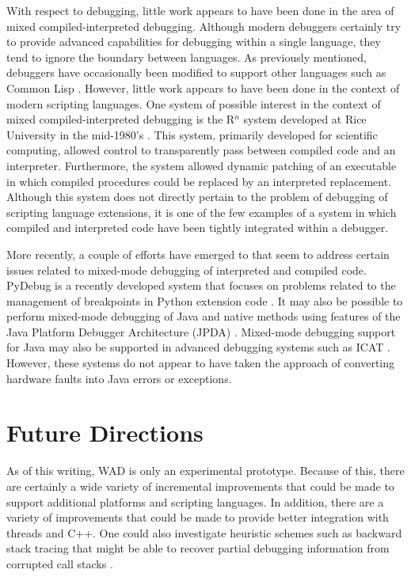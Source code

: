 With respect to debugging, little work appears to have been done in the area of
mixed compiled-interpreted debugging.   Although modern debuggers
certainly try to provide advanced capabilities for debugging within a
single language, they tend to ignore the boundary between languages.
As previously mentioned, debuggers have occasionally been modified to
support other languages such as Common Lisp \cite{wcl}.  However, little work appears
to have been done in the context of modern scripting languages.  One system of possible interest
in the context of mixed compiled-interpreted debugging is the R$^{n}$
system developed at Rice University in the mid-1980's \cite{carle}.  This
system, primarily developed for scientific computing, allowed control
to transparently pass between compiled code and an interpreter.
Furthermore, the system allowed dynamic patching of an executable in
which compiled procedures could be replaced by an interpreted
replacement.  Although this system does not directly pertain to the problem of 
debugging of scripting language extensions, it is one of the few
examples of a system in which compiled and interpreted code have been
tightly integrated within a debugger.

More recently, a couple of efforts have emerged to that seem to
address certain issues related to mixed-mode debugging of interpreted
and compiled code. PyDebug is a recently developed system that focuses
on problems related to the management of breakpoints in Python
extension code \cite{pydebug}.  It may also be possible to perform
mixed-mode debugging of Java and native methods using features of the
Java Platform Debugger Architecture (JPDA) \cite{jpda}.  Mixed-mode
debugging support for Java may also be supported in advanced debugging systems
such as ICAT \cite{icat}.
However, these systems do not appear to have taken the approach of
converting hardware faults into Java errors or exceptions.

\section{Future Directions}

As of this writing, WAD is only an experimental prototype.  Because of
this, there are certainly a wide variety of incremental improvements
that could be made to support additional platforms and scripting
languages. In addition, there are a variety of improvements that could be made
to provide better integration with threads and C++.  One could also
investigate heuristic schemes such as backward stack tracing that might be able
to recover partial debugging information from corrupted call stacks \cite{debug}.

